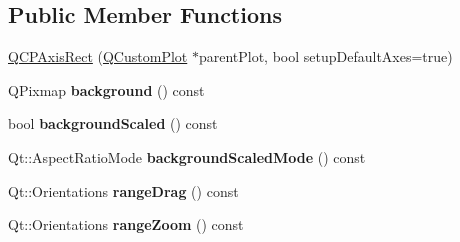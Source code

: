 \subsection*{\-Public \-Member \-Functions}
\begin{DoxyCompactItemize}
\item 
\hyperlink{classQCPAxisRect_a60b31dece805462c1b82eea2e69ba042}{\-Q\-C\-P\-Axis\-Rect} (\hyperlink{classQCustomPlot}{\-Q\-Custom\-Plot} $\ast$parent\-Plot, bool setup\-Default\-Axes=true)
\item 
\hypertarget{classQCPAxisRect_a0daa1dadd2a62dbfa37b7f742edd0059}{\-Q\-Pixmap {\bfseries background} () const }\label{classQCPAxisRect_a0daa1dadd2a62dbfa37b7f742edd0059}

\item 
\hypertarget{classQCPAxisRect_a67c18777b88fe9c81dee3dd2b5f50e5c}{bool {\bfseries background\-Scaled} () const }\label{classQCPAxisRect_a67c18777b88fe9c81dee3dd2b5f50e5c}

\item 
\hypertarget{classQCPAxisRect_a3d0f42d6be11a0b3d4576402a2b0032d}{\-Qt\-::\-Aspect\-Ratio\-Mode {\bfseries background\-Scaled\-Mode} () const }\label{classQCPAxisRect_a3d0f42d6be11a0b3d4576402a2b0032d}

\item 
\hypertarget{classQCPAxisRect_af24b46954ce27a26b23770cdb8319080}{\-Qt\-::\-Orientations {\bfseries range\-Drag} () const }\label{classQCPAxisRect_af24b46954ce27a26b23770cdb8319080}

\item 
\hypertarget{classQCPAxisRect_a3397fc60e5df29089090bc236e9f05f6}{\-Qt\-::\-Orientations {\bfseries range\-Zoom} () const }\label{classQCPAxisRect_a3397fc60e5df29089090bc236e9f05f6}


\end{DoxyCompactItemize}
